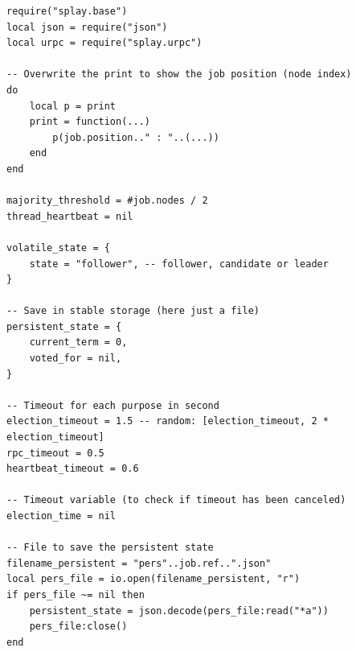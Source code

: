 \documentclass{eplmastersthesis}
\begin{document}
        \begin{minipage}{\linewidth}
        \begin{lstlisting}[style=MySmallLua,caption={Initialisation}]
require("splay.base")
local json = require("json")
local urpc = require("splay.urpc")

-- Overwrite the print to show the job position (node index)
do
	local p = print
	print = function(...)
		p(job.position.." : "..(...))
	end
end

majority_threshold = #job.nodes / 2
thread_heartbeat = nil

volatile_state = {
    state = "follower", -- follower, candidate or leader
}

-- Save in stable storage (here just a file)
persistent_state = {
    current_term = 0,
    voted_for = nil,
}

-- Timeout for each purpose in second
election_timeout = 1.5 -- random: [election_timeout, 2 * election_timeout]
rpc_timeout = 0.5
heartbeat_timeout = 0.6

-- Timeout variable (to check if timeout has been canceled)
election_time = nil

-- File to save the persistent state
filename_persistent = "pers"..job.ref..".json"
local pers_file = io.open(filename_persistent, "r")
if pers_file ~= nil then
    persistent_state = json.decode(pers_file:read("*a"))
    pers_file:close()
end
        \end{lstlisting}
        \end{minipage}
\end{document}
